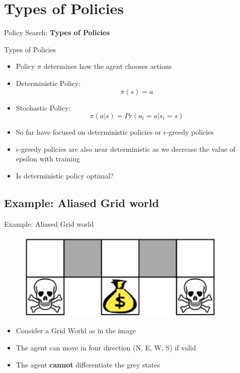 \section{Types of Policies}
\begin{frame}{}
    \LARGE Policy Search: \textbf{Types of Policies}
\end{frame}

\begin{frame}{Types of Policies}
    \begin{itemize}
        \item Policy $\pi$ determines how the agent chooses actions
        \item Deterministic Policy: $$\pi(s) = a$$
        \item Stochastic Policy: $$\pi(a|s) = Pr(a_t = a | s_t = s)$$
        \item So far have focused on deterministic policies or $\epsilon$-greedy policies
        \item $\epsilon$-greedy policies are also near deterministic as we decrease the value of epsilon with training
        \item Is deterministic policy optimal?
    \end{itemize} 
\end{frame}

\subsection{Example: Aliased Grid world}
\begin{frame}{Example: Aliased Grid world}
    \begin{figure}
        \centering
        \includegraphics[width=0.9\textwidth,height=0.3\textheight,keepaspectratio]{images/policy-search/grid_world_1.png}
    \end{figure}

    \begin{itemize}
        \item Consider a Grid World as in the image
        \item The agent can move in four direction (N, E, W, S) if valid
        \item The agent \textbf{cannot} differentiate the grey states
    \end{itemize}
\end{frame}

